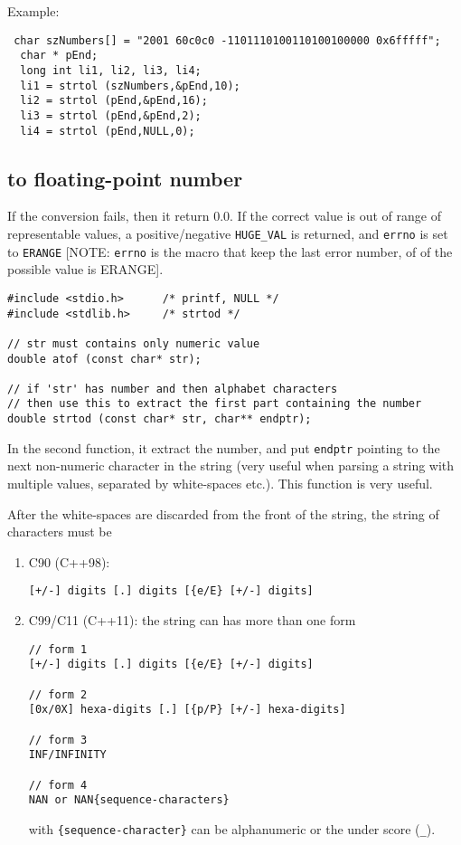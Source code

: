 Example:
\begin{verbatim}
 char szNumbers[] = "2001 60c0c0 -1101110100110100100000 0x6fffff";
  char * pEnd;
  long int li1, li2, li3, li4;
  li1 = strtol (szNumbers,&pEnd,10);
  li2 = strtol (pEnd,&pEnd,16);
  li3 = strtol (pEnd,&pEnd,2);
  li4 = strtol (pEnd,NULL,0);
\end{verbatim}

\subsection{to floating-point number}

If the conversion fails, then it return 0.0. If the correct value is out of
range of representable values, a positive/negative \verb!HUGE_VAL! is returned,
and \verb!errno! is set to \verb!ERANGE! [NOTE: \verb!errno! is the macro that
keep the last error number, of of the possible value is ERANGE].
\begin{verbatim}
#include <stdio.h>      /* printf, NULL */
#include <stdlib.h>     /* strtod */

// str must contains only numeric value
double atof (const char* str);

// if 'str' has number and then alphabet characters
// then use this to extract the first part containing the number
double strtod (const char* str, char** endptr);
\end{verbatim}
In the second function, it extract the number, and put \verb!endptr! pointing to
the next non-numeric character in the string (very useful when parsing a string
with multiple values, separated by white-spaces etc.). This function is
very useful.

After the white-spaces are discarded from the front of the string, the string of
characters must be
\begin{enumerate}
  \item C90 (C++98): 
\begin{verbatim}
[+/-] digits [.] digits [{e/E} [+/-] digits]
\end{verbatim}
  \item C99/C11 (C++11): the string can has more than one form
\begin{verbatim}
// form 1
[+/-] digits [.] digits [{e/E} [+/-] digits]

// form 2
[0x/0X] hexa-digits [.] [{p/P} [+/-] hexa-digits]

// form 3
INF/INFINITY

// form 4
NAN or NAN{sequence-characters}
\end{verbatim}
with \verb!{sequence-character}! can be alphanumeric or the under score
(\verb!_!).
\end{enumerate}

